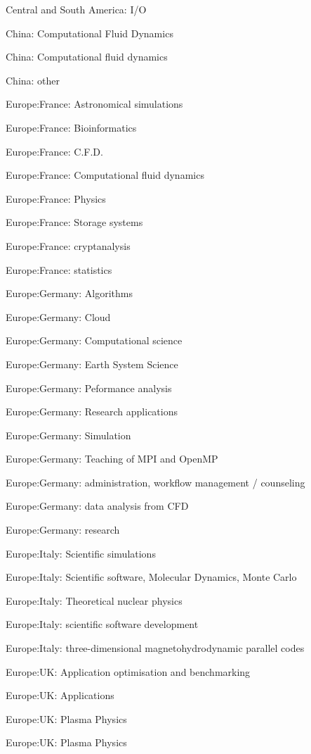 \item Central and South America: I/O
\item China: Computational Fluid Dynamics
\item China: Computational fluid dynamics
\item China: other
\item Europe:France: Astronomical simulations
\item Europe:France: Bioinformatics
\item Europe:France: C.F.D.
\item Europe:France: Computational fluid dynamics
\item Europe:France: Physics
\item Europe:France: Storage systems
\item Europe:France: cryptanalysis
\item Europe:France: statistics
\item Europe:Germany: Algorithms
\item Europe:Germany: Cloud
\item Europe:Germany: Computational science
\item Europe:Germany: Earth System Science
\item Europe:Germany: Peformance analysis
\item Europe:Germany: Research applications
\item Europe:Germany: Simulation
\item Europe:Germany: Teaching of MPI and OpenMP
\item Europe:Germany: administration, workflow management / counseling
\item Europe:Germany: data analysis from CFD
\item Europe:Germany: research
\item Europe:Italy: Scientific simulations
\item Europe:Italy: Scientific software, Molecular Dynamics, Monte Carlo
\item Europe:Italy: Theoretical nuclear physics
\item Europe:Italy: scientific software development
\item Europe:Italy: three-dimensional magnetohydrodynamic parallel codes
\item Europe:UK: Application optimisation and benchmarking
\item Europe:UK: Applications
\item Europe:UK: Plasma Physics
\item Europe:UK: Plasma Physics
